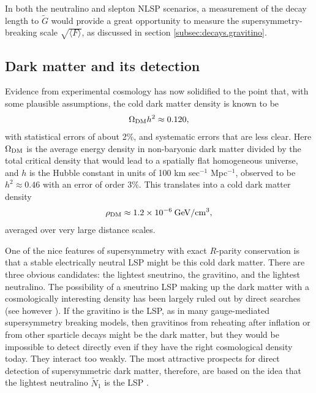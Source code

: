 \documentclass[11pt]{article}
\def\beq{\begin{eqnarray}}
\def\eeq{\end{eqnarray}}
\def\stilde{\widetilde}
\def\NI{\stilde N_1}
\begin{document}
In both the neutralino and slepton NLSP scenarios, a measurement of the 
decay length to $\stilde G$ would provide a great opportunity to measure 
the supersymmetry-breaking scale $\sqrt{\langle F \rangle}$, as discussed 
in section \ref{subsec:decays.gravitino}.

\subsection{Dark matter and its detection}\label{subsec:signals.darkmatter}
\setcounter{equation}{0}
\setcounter{footnote}{1}

Evidence from experimental cosmology has now solidified to the point that, 
with some plausible assumptions, the cold dark matter density is known to 
be \cite{cosmokramer,RPP}
\beq
\Omega_{\rm DM} h^2 \approx 0.120,
\label{eq:OmegaDM}
\eeq
with statistical errors of about 2\%, and systematic errors that are less 
clear. Here $\Omega_{\rm DM}$ is the average energy density in 
non-baryonic dark matter divided by the total critical density that would 
lead to a spatially flat homogeneous universe, and $h$ is the Hubble 
constant in units of 100 km sec$^{-1}$ Mpc$^{-1}$, observed to be $h^2 
\approx 0.46$ with an error of order 3\%. This translates into a cold dark 
matter density
\beq
\rho_{\rm DM} \approx 1.2 \times 10^{-6} \> {\rm GeV}/{\rm cm}^3 ,
\label{eq:rhodm}
\eeq 
averaged over very large distance scales.

One of the nice features of supersymmetry with exact $R$-parity 
conservation is that a stable electrically neutral LSP might be this cold 
dark matter.  There are three obvious candidates:  the lightest sneutrino, 
the gravitino, and the lightest neutralino. The possibility of a sneutrino 
LSP making up the dark matter with a cosmologically interesting density 
has been largely ruled out by direct searches \cite{sneutrinonotLSP} (see 
however \cite{sneutrinoLSP}). If the gravitino is the LSP, as in many 
gauge-mediated supersymmetry breaking models, then gravitinos from 
reheating after inflation \cite{gravitinoDMfromreheating} or from other 
sparticle decays \cite{gravitinoDMfromdecays} might be the dark matter, 
but they would be impossible to detect directly even if they have the 
right cosmological density today. They interact too weakly. The most 
attractive prospects for direct detection of supersymmetric dark matter, 
therefore, are based on the idea that the lightest neutralino $\NI$ is the 
LSP \cite{neutralinodarkmatter,darkmatterreviews}.
\end{document}
